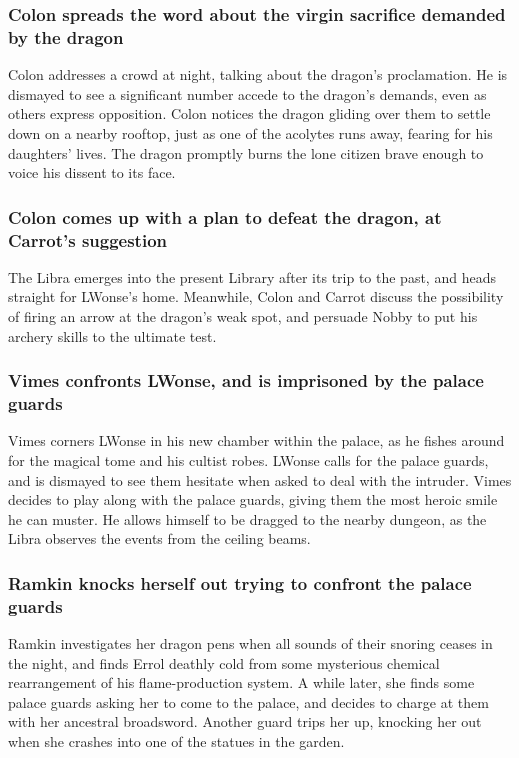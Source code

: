 \subsubsection{\Gls{Colon} spreads the word about the virgin sacrifice demanded by the dragon}
\Gls{Colon} addresses a crowd at night, talking about the dragon's proclamation. He is dismayed to
see a significant number accede to the dragon's demands, even as others express opposition.
\Gls{Colon} notices the dragon gliding over them to settle down on a nearby rooftop, just as
one of the acolytes runs away, fearing for his daughters' lives. The dragon promptly burns the lone
citizen brave enough to voice his dissent to its face.

\subsubsection{\Gls{Colon} comes up with a plan to defeat the dragon, at \Gls{Carrot}'s suggestion}
The \Gls{Libra} emerges into the present Library after its trip to the past, and heads straight
for \Gls{LWonse}'s home. Meanwhile, \Gls{Colon} and \Gls{Carrot} discuss the possibility of
firing an arrow at the dragon's weak spot, and persuade \Gls{Nobby} to put his archery skills to the
ultimate test.

\subsubsection{\Gls{Vimes} confronts \Gls{LWonse}, and is imprisoned by the palace guards}
\Gls{Vimes} corners \Gls{LWonse} in his new chamber within the palace, as he fishes around for the
magical tome and his cultist robes. \Gls{LWonse} calls for the palace guards, and is dismayed to
see them hesitate when asked to deal with the intruder. \Gls{Vimes} decides to play along with the
palace guards, giving them the most heroic smile he can muster. He allows himself to be dragged to
the nearby dungeon, as the \Gls{Libra} observes the events from the ceiling beams.

\subsubsection{\Gls{Ramkin} knocks herself out trying to confront the palace guards}
\Gls{Ramkin} investigates her dragon pens when all sounds of their snoring ceases in the night, and
finds \Gls{Errol} deathly cold from some mysterious chemical rearrangement of his flame-production
system. A while later, she finds some palace guards asking her to come to the palace, and decides
to charge at them with her ancestral broadsword. Another guard trips her up, knocking her out when
she crashes into one of the statues in the garden.

